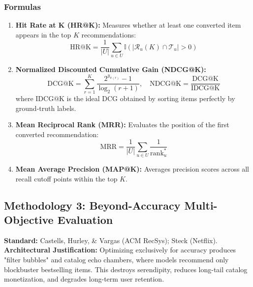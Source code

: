 \documentclass[11pt,a4paper]{article}
\begin{document}
\subsubsection{Formulas}
\begin{enumerate}
    \item \textbf{Hit Rate at K (HR@K):}
    Measures whether at least one converted item appears in the top $K$ recommendations:
    \begin{equation}
        \text{HR@K} = \frac{1}{|U|} \sum_{u \in U} \mathbb{I}\left( |\mathcal{R}_u(K) \cap \mathcal{T}_u| > 0 \right)
    \end{equation}
    \item \textbf{Normalized Discounted Cumulative Gain (NDCG@K):}
    \begin{equation}
        \text{DCG@K} = \sum_{r=1}^K \frac{2^{y_{\pi(r)}} - 1}{\log_2(r + 1)}, \quad \text{NDCG@K} = \frac{\text{DCG@K}}{\text{IDCG@K}}
    \end{equation}
    where $\text{IDCG@K}$ is the ideal DCG obtained by sorting items perfectly by ground-truth labels.
    \item \textbf{Mean Reciprocal Rank (MRR):}
    Evaluates the position of the first converted recommendation:
    \begin{equation}
        \text{MRR} = \frac{1}{|U|} \sum_{u \in U} \frac{1}{\text{rank}_u^*}
    \end{equation}
    \item \textbf{Mean Average Precision (MAP@K):}
    Averages precision scores across all recall cutoff points within the top $K$.
\end{enumerate}

\subsection{Methodology 3: Beyond-Accuracy Multi-Objective Evaluation}
\textbf{Standard:} Castells, Hurley, \& Vargas (ACM RecSys); Steck (Netflix).\\
\textbf{Architectural Justification:} Optimizing exclusively for accuracy produces "filter bubbles" and catalog echo chambers, where models recommend only blockbuster bestselling items. This destroys serendipity, reduces long-tail catalog monetization, and degrades long-term user retention.
\end{document}
